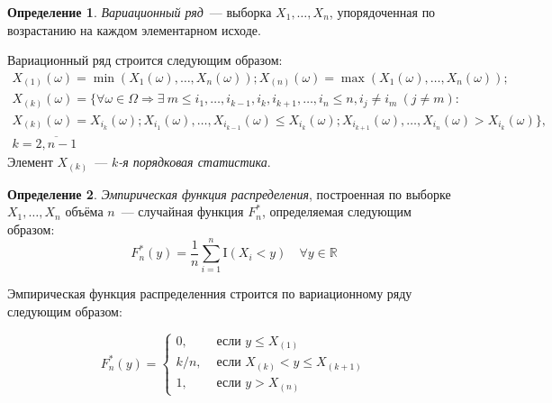 \documentclass[oneside,final,14pt]{extreport}
\theoremstyle{plain}
\theoremstyle{definition}
\newtheorem*{defn}{Определение}
\newtheorem*{rmrk}{Замечание}
\theoremstyle{named}
\begin{document}


\begin{defn}
{\it Вариационный ряд}~--- выборка $X_{1}, \ldots, X_{n}$, упорядоченная по возрастанию на каждом элементарном исходе.
\end{defn}
Вариационный ряд строится следующим образом:
\begin{multline*}
    X_{(1)}(\omega)=\min (X_{1}(\omega), \ldots, X_{n}(\omega)); X_{(n)}(\omega)=\max (X_{1}(\omega), \ldots, X_{n}(\omega)); \\
    X_{(k)}(\omega)=\{\forall \omega \in \Omega \Rightarrow \exists~ m \leqslant i_{1}, \ldots, i_{k-1}, i_{k}, i_{k+1}, \ldots, i_{n} \leqslant n, i_{j} \neq i_{m}~ (j \neq m): \\ 
    X_{(k)}(\omega)=X_{i_{k}}(\omega);
    X_{i_{1}}(\omega), \ldots, X_{i_{k-1}}(\omega) \leqslant X_{i_{k}}(\omega); X_{i_{k+1}}(\omega), \ldots, X_{i_{n}}(\omega)>X_{i_{k}}(\omega)\}, \\
    k = \overline{2, n-1}
\end{multline*}
Элемент $X_{(k)}$~--- {\it $k$-я порядковая статистика}.

\begin{defn}
{\it Эмпирическая функция распределения}, построенная по выборке $X_{1}, \ldots, X_{n}$ объёма $n$~--- случайная функция $F_{n}^{*}$, определяемая следующим образом:
\begin{equation*}
    F_{n}^{*}(y) =\frac{1}{n} \sum\limits_{i=1}^{n} \mathrm{I}\left(X_{i}<y\right) \quad \forall y \in \mathbb{R}
\end{equation*}
\end{defn}

Эмпирическая функция распределенния строится по вариационному ряду следующим образом:

\begin{equation*}
    F_{n}^{*}(y)=\left\{\begin{array}{ll}
    0, & \text { если } y \leqslant X_{(1)} \\
    k/n, & \text { если } X_{(k)}<y \leqslant X_{(k+1)} \\
    1, & \text { если } y>X_{(n)}
    \end{array}\right.
\end{equation*}
\end{document}
